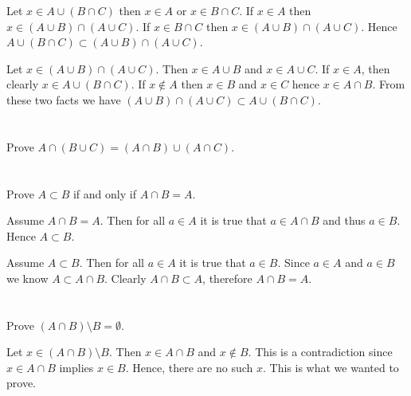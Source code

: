 \documentclass[a4paper]{article}
\begin{document}
Let $x \in A \cup (B \cap C)$ then $x \in A$ or $x \in B \cap C$. If $x \in A$ then $x \in (A \cup B) \cap (A \cup C)$. If $x \in B \cap C$ then $x \in (A \cup B) \cap (A \cup C)$. Hence $A \cup (B \cap C) \subset (A \cup B) \cap (A \cup C)$. 

\vspace{\baselineskip}

Let $x \in (A \cup B) \cap (A \cup C)$. Then $x \in A \cup B$ and $x \in A \cup C$. If $x \in A$, then clearly $x \in A \cup (B \cap C)$. If $x \not\in A$ then $x \in B$ and $x \in C$ hence $x \in A \cap B$. From these two facts we have  $(A \cup B) \cap (A \cup C) \subset A \cup (B \cap C)$.


\section{}

Prove $A \cap (B \cup C) = (A \cap B) \cup (A \cap C)$.


\section{}

Prove $A \subset B$ if and only if $A \cap B = A$.

\vspace{\baselineskip}

Assume $A \cap B = A$. Then  for all $a \in A$ it is true that $a \in A \cap B$ and thus $a \in B$. Hence $A \subset B$.

\vspace{\baselineskip}

Assume $A \subset B$. Then for all $a \in A$ it is true that $a \in B$. Since $a \in A$ and $a \in B$ we know $A \subset A \cap B$. Clearly $A \cap B \subset A$, therefore $A \cap B = A$.

\section{}


\section{}


\section{}


\section{}

Prove $(A \cap B) \setminus B = \emptyset$.

\vspace{\baselineskip}

Let $ x \in (A \cap B) \setminus B$. Then $x \in A \cap B$ and $x \not\in B$. This is a contradiction since $x \in A \cap B$ implies $x \in B$. Hence, there are no such $x$. This is what we wanted to prove.
\end{document}
